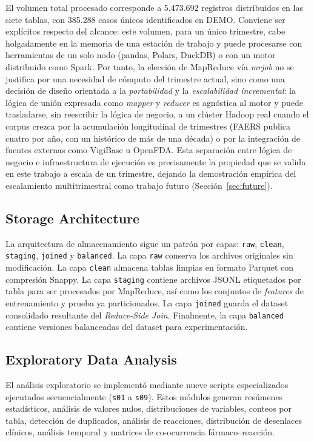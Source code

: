 \documentclass[12pt,a4paper]{article}
\begin{document}
El volumen total procesado corresponde a 5.473.692 registros distribuidos en las siete tablas, con 385.288 casos únicos identificados en DEMO. Conviene ser explícitos respecto del alcance: este volumen, para un único trimestre, cabe holgadamente en la memoria de una estación de trabajo y puede procesarse con herramientas de un solo nodo (pandas, Polars, DuckDB) o con un motor distribuido como Spark. Por tanto, la elección de MapReduce vía \textit{mrjob} no se justifica por una necesidad de cómputo del trimestre actual, sino como una decisión de diseño orientada a la \textit{portabilidad} y la \textit{escalabilidad incremental}: la lógica de unión expresada como \textit{mapper} y \textit{reducer} es agnóstica al motor y puede trasladarse, sin reescribir la lógica de negocio, a un clúster Hadoop real cuando el corpus crezca por la acumulación longitudinal de trimestres (FAERS publica cuatro por año, con un histórico de más de una década) o por la integración de fuentes externas como VigiBase u OpenFDA. Esta separación entre lógica de negocio e infraestructura de ejecución es precisamente la propiedad que se valida en este trabajo a escala de un trimestre, dejando la demostración empírica del escalamiento multitrimestral como trabajo futuro (Sección~\ref{sec:future}).

\subsection{Storage Architecture}
La arquitectura de almacenamiento sigue un patrón por capas: \texttt{raw}, \texttt{clean}, \texttt{staging}, \texttt{joined} y \texttt{balanced}. La capa \texttt{raw} conserva los archivos originales sin modificación. La capa \texttt{clean} almacena tablas limpias en formato Parquet con compresión Snappy. La capa \texttt{staging} contiene archivos JSONL etiquetados por tabla para ser procesados por MapReduce, así como los conjuntos de \textit{features} de entrenamiento y prueba ya particionados. La capa \texttt{joined} guarda el dataset consolidado resultante del \textit{Reduce-Side Join}. Finalmente, la capa \texttt{balanced} contiene versiones balanceadas del dataset para experimentación.

\subsection{Exploratory Data Analysis}
El análisis exploratorio se implementó mediante nueve scripts especializados ejecutados secuencialmente (\texttt{s01} a \texttt{s09}). Estos módulos generan resúmenes estadísticos, análisis de valores nulos, distribuciones de variables, conteos por tabla, detección de duplicados, análisis de reacciones, distribución de desenlaces clínicos, análisis temporal y matrices de co-ocurrencia fármaco--reacción.
\end{document}
